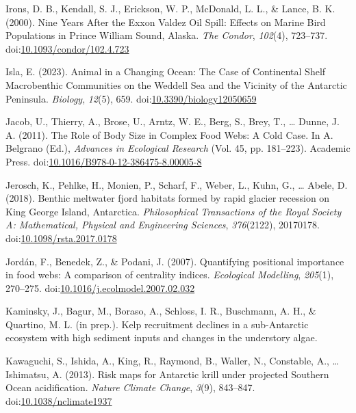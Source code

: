 \documentclass[
]{article}
\newlength{\cslhangindent}
\newlength{\cslentryspacingunit} %
\newenvironment{CSLReferences}[2] %
 {%
  \setlength{\parindent}{0pt}
  \ifodd #1
  \let\oldpar\par
  \def\par{\hangindent=\cslhangindent\oldpar}
  \fi
  \setlength{\parskip}{#2\cslentryspacingunit}
 }%
 {}
\begin{document}
\begin{CSLReferences}{1}{0}
\leavevmode{}%
Irons, D. B., Kendall, S. J., Erickson, W. P., McDonald, L. L., \&
Lance, B. K. (2000). Nine {Years After} the {Exxon Valdez Oil Spill}:
{Effects} on {Marine Bird Populations} in {Prince William Sound},
{Alaska}. \emph{The Condor}, \emph{102}(4), 723--737.
doi:\href{https://doi.org/10.1093/condor/102.4.723}{10.1093/condor/102.4.723}

\leavevmode{}%
Isla, E. (2023). Animal in a
{Changing Ocean}: {The Case} of {Continental Shelf Macrobenthic
Communities} on the {Weddell Sea} and the {Vicinity} of the {Antarctic
Peninsula}. \emph{Biology}, \emph{12}(5), 659.
doi:\href{https://doi.org/10.3390/biology12050659}{10.3390/biology12050659}

\leavevmode{}%
Jacob, U., Thierry, A., Brose, U., Arntz, W. E., Berg, S., Brey, T.,
\ldots{} Dunne, J. A. (2011). The {Role} of {Body Size} in {Complex Food
Webs}: {A Cold Case}. In A. Belgrano (Ed.), \emph{Advances in
{Ecological Research}} (Vol. 45, pp. 181--223). {Academic Press}.
doi:\href{https://doi.org/10.1016/B978-0-12-386475-8.00005-8}{10.1016/B978-0-12-386475-8.00005-8}

\leavevmode{}%
Jerosch, K., Pehlke, H., Monien, P., Scharf, F., Weber, L., Kuhn, G.,
\ldots{} Abele, D. (2018). Benthic meltwater fjord habitats formed by
rapid glacier recession on {King George Island}, {Antarctica}.
\emph{Philosophical Transactions of the Royal Society A: Mathematical,
Physical and Engineering Sciences}, \emph{376}(2122), 20170178.
doi:\href{https://doi.org/10.1098/rsta.2017.0178}{10.1098/rsta.2017.0178}

\leavevmode{}%
Jordán, F., Benedek, Z., \& Podani, J. (2007). Quantifying positional
importance in food webs: {A} comparison of centrality indices.
\emph{Ecological Modelling}, \emph{205}(1), 270--275.
doi:\href{https://doi.org/10.1016/j.ecolmodel.2007.02.032}{10.1016/j.ecolmodel.2007.02.032}

\leavevmode{}%
Kaminsky, J., Bagur, M., Boraso, A., Schloss, I. R., Buschmann, A. H.,
\& Quartino, M. L. (in prep.). Kelp recruitment declines in a
sub-{Antarctic} ecosystem with high sediment inputs and changes in the
understory algae.

\leavevmode{}%
Kawaguchi, S., Ishida, A., King, R., Raymond, B., Waller, N., Constable,
A., \ldots{} Ishimatsu, A. (2013). Risk maps for {Antarctic} krill under
projected {Southern Ocean} acidification. \emph{Nature Climate Change},
\emph{3}(9), 843--847.
doi:\href{https://doi.org/10.1038/nclimate1937}{10.1038/nclimate1937}


\end{CSLReferences}
\end{document}
